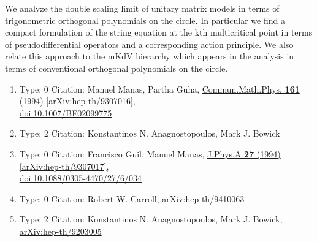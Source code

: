 \documentclass[a4paper,10pt]{article}
\begin{document}
\begin{enumerate}
We analyze the double scaling limit of unitary matrix models in terms of trigonometric orthogonal polynomials on the circle. In particular we find a compact formulation of the string equation at the kth multicritical point in terms of pseudodifferential operators and a corresponding action principle. We also relate this approach to the mKdV hierarchy which appears in the analysis in terms of conventional orthogonal polynomials on the circle.
\begin{enumerate}
  \item Type: 0 Citation: Manuel Manas, Partha Guha, \href{https://www.doi.org/10.1007/BF02099775}{Commun.Math.Phys. {\bf 161} (1994) }  \href{https://arxiv.org/abs/hep-th/9307016}{[arXiv:hep-th/9307016]},\\\href{https://www.doi.org/10.1007/BF02099775}{doi:10.1007/BF02099775}
  \item Type: 2 Citation: Konstantinos N. Anagnostopoulos, Mark J. Bowick
  \item Type: 0 Citation: Francisco Guil, Manuel Manas, \href{https://www.doi.org/10.1088/0305-4470/27/6/034}{J.Phys.A {\bf 27} (1994) }  \href{https://arxiv.org/abs/hep-th/9307017}{[arXiv:hep-th/9307017]},\\\href{https://www.doi.org/10.1088/0305-4470/27/6/034}{doi:10.1088/0305-4470/27/6/034}
  \item Type: 0 Citation: Robert W. Carroll, \href{https://arxiv.org/abs/hep-th/9410063}{arXiv:hep-th/9410063}
  \item Type: 2 Citation: Konstantinos N. Anagnostopoulos, Mark J. Bowick, \href{https://arxiv.org/abs/hep-th/9203005}{arXiv:hep-th/9203005}

\end{enumerate}
\end{enumerate}
\end{document}
